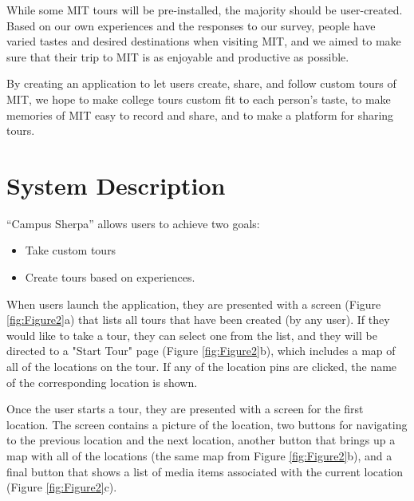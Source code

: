 \documentclass{sigchi}
\begin{document}
While some MIT tours will be pre-installed, the majority should be user-created.
Based on our own experiences and the responses to our survey, people have varied tastes and desired destinations when visiting MIT, and we aimed to make sure that their trip to MIT is as enjoyable and productive as possible.

By creating an application to let users create, share, and follow custom tours of MIT, we hope to make college tours custom fit to each person's taste, to make memories of MIT easy to record and share, and to make a platform for sharing tours.

\section{System Description}

``Campus Sherpa'' allows users to achieve two goals: 

\begin{itemize}
	\item Take custom tours
	\item Create tours based on experiences.
\end{itemize}

When users launch the application, they are presented with a screen (Figure \ref{fig:Figure2}a) that lists all tours that have been created (by any user). If they would like to take a tour, they can select one from the list, and they will be directed to a "Start Tour" page (Figure \ref{fig:Figure2}b), which includes a map of all of the locations on the tour. If any of the location pins are clicked, the name of the corresponding location is shown.

Once the user starts a tour, they are presented with a screen for the first location. The screen contains a picture of the location, two buttons for navigating to the previous location and the next location, another button that brings up a map with all of the locations (the same map from Figure \ref{fig:Figure2}b), and a final button that shows a list of media items associated with the current location (Figure \ref{fig:Figure2}c).
\end{document}
